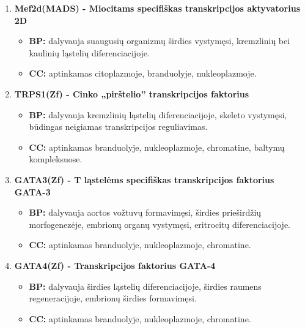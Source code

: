 \documentclass[12pt]{article}
\begin{document}
\begin{enumerate}
    \item \textbf{Mef2d(MADS)\cite{MEF2D} - Miocitams specifiškas transkripcijos
                  aktyvatorius 2D}
        \begin{itemize}
            \item \textbf{BP:} dalyvauja suaugusių organizmų širdies
            vystymęsi, kremzlinių bei kaulinių ląstelių diferenciacijoje.
            \item \textbf{CC:} aptinkamas citoplazmoje, branduolyje,
            nukleoplazmoje.
        \end{itemize}

    \item \textbf{TRPS1(Zf)\cite{TRPS1} - Cinko „pirštelio” transkripcijos
                  faktorius}
        \begin{itemize}
            \item \textbf{BP:} dalyvauja kremzlinių ląstelių
            diferenciacijoje, skeleto vystymęsi, būdingas
            neigiamas transkripcijos reguliavimas.
            \item \textbf{CC:} aptinkamas branduolyje, nukleoplazmoje,
            chromatine, baltymų kompleksuose.
        \end{itemize}

    \item \textbf{GATA3(Zf)\cite{GATA3} - T ląstelėms specifiškas transkripcijos
                  faktorius GATA-3}
        \begin{itemize}
            \item \textbf{BP:} dalyvauja aortos vožtuvų formavimęsi,
            širdies prieširdžių morfogenezėje, embrionų organų
            vystymęsi, eritrocitų diferenciacijoje.
            \item \textbf{CC:} aptinkamas branduolyje, nukleoplazmoje,
            chromatine.
        \end{itemize}

    \item \textbf{GATA4(Zf)\cite{GATA4} - Transkripcijos faktorius GATA-4}
        \begin{itemize}
            \item \textbf{BP:} dalyvauja širdies ląstelių
            diferenciacijoje, širdies raumens regeneracijoje,
            embrionų širdies formavimęsi.
            \item \textbf{CC:} aptinkamas branduolyje, nukleoplazmoje,
            chromatine.
        \end{itemize}


\end{enumerate}
\end{document}
